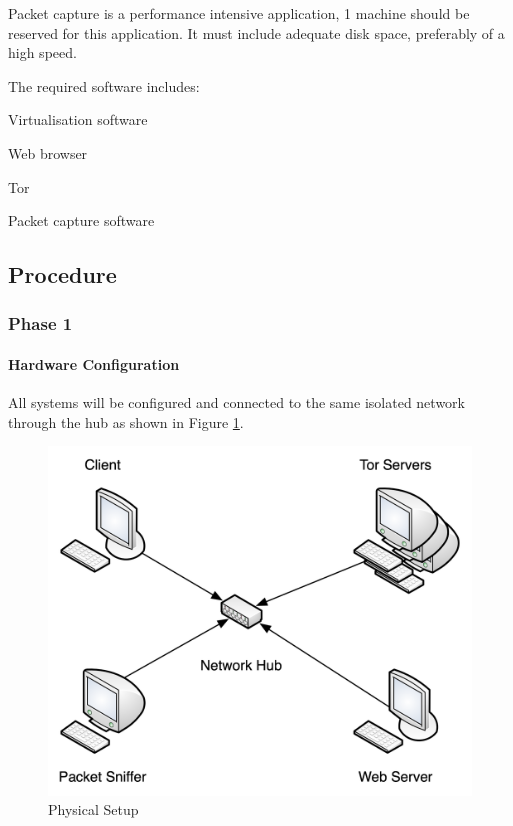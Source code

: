 \documentclass{ecuthesis}
\begin{document}
Packet capture is a performance intensive application, 1 machine should be reserved for this application. It must include adequate disk space, preferably of a high speed. 

The required software includes:

\begin{itemize*}
\item Virtualisation software
\item Web browser
\item Tor
\item Packet capture software
\end{itemize*}

\subsection{Procedure}

\subsubsection{Phase 1}

\paragraph{Hardware Configuration}

All systems will be configured and connected to the same isolated network through the hub as shown in Figure \ref{physical-setup}.

\begin{figure}[h]
\center \includegraphics[scale=0.8]{physical-setup}
\caption{Physical Setup}
\label{physical-setup}
\end{figure}
\end{document}
